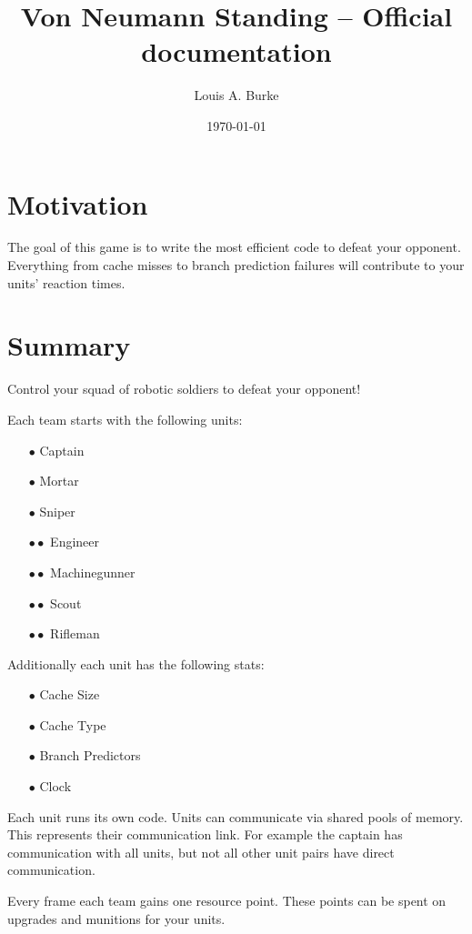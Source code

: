\documentclass{article}
\title{Von Neumann Standing -- Official documentation}
\date{\today}
\author{Louis A. Burke}
\begin{document}
\maketitle \clearpage

\section*{Motivation}

The goal of this game is to write the most efficient code to defeat your
opponent. Everything from cache misses to branch prediction failures will
contribute to your units' reaction times.

\section*{Summary}

Control your squad of robotic soldiers to defeat your opponent!

Each team starts with the following units:

\begin{itemize}[noitemsep]
    \item[$\bullet$] Captain
    \item[$\bullet$] Mortar
    \item[$\bullet$] Sniper
    \item[$\bullet\bullet$] Engineer
    \item[$\bullet\bullet$] Machinegunner
    \item[$\bullet\bullet$] Scout
    \item[$\bullet\bullet$] Rifleman
\end{itemize}

Additionally each unit has the following stats:

\begin{itemize}[noitemsep]
    \item[$\bullet$] Cache Size
    \item[$\bullet$] Cache Type
    \item[$\bullet$] Branch Predictors
    \item[$\bullet$] Clock
\end{itemize}

Each unit runs its own code. Units can communicate via shared pools of memory.
This represents their communication link. For example the captain has
communication with all units, but not all other unit pairs have direct
communication.

Every frame each team gains one resource point. These points can be spent on
upgrades and munitions for your units.
\end{document}

